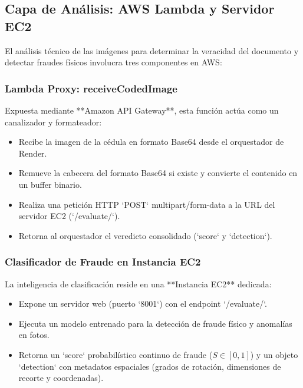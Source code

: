 \subsection{Capa de Análisis: AWS Lambda y Servidor EC2}
El análisis técnico de las imágenes para determinar la veracidad del documento y detectar fraudes físicos involucra tres componentes en AWS:

\subsubsection{Lambda Proxy: receiveCodedImage}
Expuesta mediante **Amazon API Gateway**, esta función actúa como un canalizador y formateador:
\begin{itemize}
    \item Recibe la imagen de la cédula en formato Base64 desde el orquestador de Render.
    \item Remueve la cabecera del formato Base64 si existe y convierte el contenido en un buffer binario.
    \item Realiza una petición HTTP `POST` multipart/form-data a la URL del servidor EC2 (`/evaluate/`).
    \item Retorna al orquestador el veredicto consolidado (`score` y `detection`).
\end{itemize}

\subsubsection{Clasificador de Fraude en Instancia EC2}
La inteligencia de clasificación reside en una **Instancia EC2** dedicada:
\begin{itemize}
    \item Expone un servidor web (puerto `8001`) con el endpoint `/evaluate/`.
    \item Ejecuta un modelo entrenado para la detección de fraude físico y anomalías en fotos.
    \item Retorna un `score` probabilístico continuo de fraude ($S \in [0, 1]$) y un objeto `detection` con metadatos espaciales (grados de rotación, dimensiones de recorte y coordenadas).
\end{itemize}


